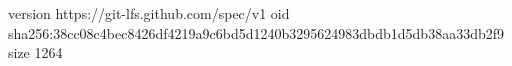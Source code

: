 version https://git-lfs.github.com/spec/v1
oid sha256:38cc08c4bec8426df4219a9c6bd5d1240b3295624983dbdb1d5db38aa33db2f9
size 1264
